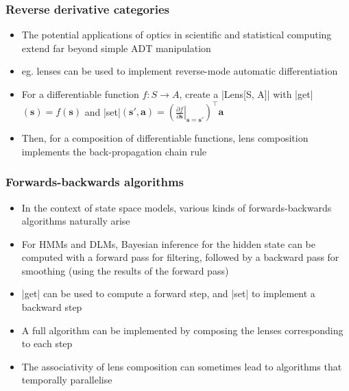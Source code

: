 \documentclass[mathserif,handout]{beamer}
\begin{document}
\begin{frame}[fragile]
  \frametitle{Reverse derivative categories}
  \begin{itemize}
    \item The potential applications of optics in scientific and statistical computing extend far beyond simple ADT manipulation
  \item eg. lenses can be used to implement \alert{reverse-mode automatic differentiation}
  \item For a differentiable function $f: S\rightarrow A$, create a |Lens[S, A]| with |get|$(\mathbf{s})=f(\mathbf{s})$ and |set|$(\mathbf{s}',\mathbf{a})=\left(\left.\frac{\partial f}{\partial \mathbf{s}}\right\vert_{\mathbf{s}=\mathbf{s}'}\right)^\top \mathbf{a}$
    \item Then, for a composition of differentiable functions, lens composition implements the back-propagation chain rule
    \end{itemize}
\end{frame}

\begin{frame}[fragile]
  \frametitle{Forwards-backwards algorithms}
  \begin{itemize}
  \item In the context of state space models, various kinds of forwards-backwards algorithms naturally arise
  \item For HMMs and DLMs, Bayesian inference for the hidden state can be computed with a forward pass for filtering, followed by a backward pass for smoothing (using the results of the forward pass)
  \item |get| can be used to compute a forward step, and |set| to implement a backward step
  \item A full algorithm can be implemented by composing the lenses corresponding to each step
    \item The associativity of lens composition can sometimes lead to algorithms that temporally parallelise
    \end{itemize}
\end{frame}
\end{document}
